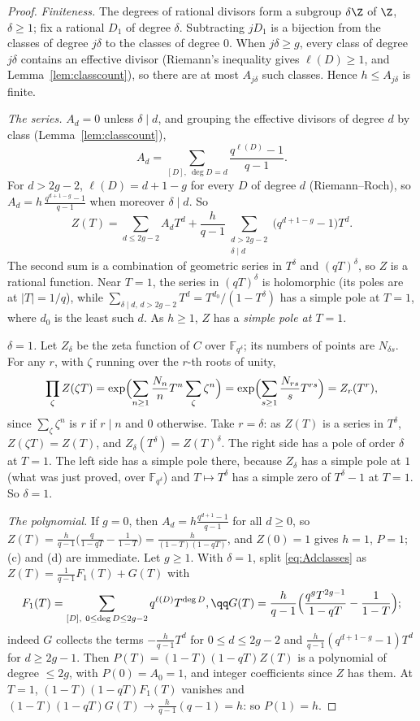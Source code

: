 \begin{proof}
\emph{Finiteness.} The degrees of rational divisors form a subgroup $\delta\Z$ of $\Z$, $\delta\ge1$; fix a rational $D_1$ of degree $\delta$. Subtracting
$jD_1$ is a bijection from the classes of degree $j\delta$ to the classes of degree $0$. When $j\delta\ge g$, every class of degree $j\delta$ contains an effective
divisor (Riemann's inequality gives $\ell(D)\ge1$, and Lemma~\ref{lem:classcount}), so there are at most $A_{j\delta}$ such classes. Hence $h\le A_{j\delta}$ is finite.

\emph{The series.} $A_d=0$ unless $\delta\mid d$, and grouping the effective divisors of degree $d$ by class (Lemma~\ref{lem:classcount}),
\begin{equation}\label{eq:Adclasses}
A_d=\sum_{[D],\ \deg D=d}\frac{q^{\ell(D)}-1}{q-1}.
\end{equation}
For $d>2g-2$, $\ell(D)=d+1-g$ for every $D$ of degree $d$ (Riemann--Roch), so $A_d=h\,\frac{q^{d+1-g}-1}{q-1}$ when moreover $\delta\mid d$. So
\[
Z(T)=\sum_{d\le2g-2}A_dT^d+\frac h{q-1}\sum_{\substack{d>2g-2\\\delta\mid d}}\bigl(q^{d+1-g}-1\bigr)T^d.
\]
The second sum is a combination of geometric series in $T^\delta$ and $(qT)^\delta$, so $Z$ is a rational function. Near $T=1$, the series in $(qT)^\delta$ is
holomorphic (its poles are at $|T|=1/q$), while $\sum_{\delta\mid d,\,d>2g-2}T^d=T^{d_0}/(1-T^\delta)$ has a simple pole at $T=1$, where $d_0$ is the least such $d$. As $h\ge1$, $Z$ has a \emph{simple pole at $T=1$}.

\emph{$\delta=1$.} Let $Z_\delta$ be the zeta function of $C$ over $\mathbb F_{q^\delta}$; its numbers of points are $N_{\delta s}$. For any $r$, with $\zeta$ running over
the $r$-th roots of unity,
\[
\prod_{\zeta}Z(\zeta T)=\exp\Bigl(\sum_{n\ge1}\frac{N_n}nT^n\sum_\zeta\zeta^n\Bigr)=\exp\Bigl(\sum_{s\ge1}\frac{N_{rs}}{s}T^{rs}\Bigr)=Z_r(T^r),
\]
since $\sum_\zeta\zeta^n$ is $r$ if $r\mid n$ and $0$ otherwise. Take $r=\delta$: as $Z(T)$ is a series in $T^\delta$, $Z(\zeta T)=Z(T)$, and $Z_\delta(T^\delta)=Z(T)^\delta$.
The right side has a pole of order $\delta$ at $T=1$. The left side has a simple pole there, because $Z_\delta$ has a simple pole at $1$ (what was just proved, over
$\mathbb F_{q^\delta}$) and $T\mapsto T^\delta$ has a simple zero of $T^\delta-1$ at $T=1$. So $\delta=1$.

\emph{The polynomial.} If $g=0$, then $A_d=h\frac{q^{d+1}-1}{q-1}$ for all $d\ge0$, so $Z(T)=\frac h{q-1}\bigl(\frac q{1-qT}-\frac1{1-T}\bigr)=\frac h{(1-T)(1-qT)}$,
and $Z(0)=1$ gives $h=1$, $P=1$; (c) and (d) are immediate. Let $g\ge1$. With $\delta=1$, split \eqref{eq:Adclasses} as $Z(T)=\frac1{q-1}F_1(T)+G(T)$ with
\[
F_1(T)=\sum_{[D],\ 0\le\deg D\le2g-2}q^{\ell(D)}T^{\deg D},
\qq
G(T)=\frac h{q-1}\Bigl(\frac{q^gT^{2g-1}}{1-qT}-\frac1{1-T}\Bigr);
\]
indeed $G$ collects the terms $-\frac h{q-1}T^d$ for $0\le d\le2g-2$ and $\frac h{q-1}(q^{d+1-g}-1)T^d$ for $d\ge2g-1$. Then $P(T)=(1-T)(1-qT)Z(T)$ is a polynomial
of degree $\le2g$, with $P(0)=A_0=1$, and integer coefficients since $Z$ has them. At $T=1$, $(1-T)(1-qT)F_1(T)$ vanishes and $(1-T)(1-qT)G(T)\to\frac h{q-1}(q-1)=h$:
so $P(1)=h$.


\end{proof}
